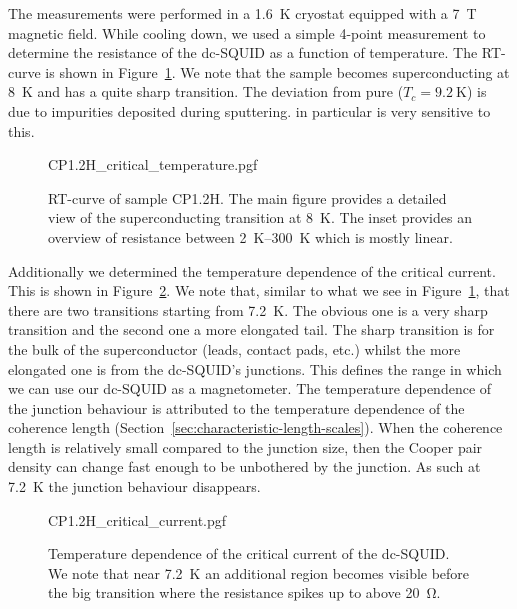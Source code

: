 The measurements were performed in a \qty{1.6}{\kelvin} cryostat equipped with a \qty{7}{\tesla} magnetic field. While cooling down, we used a simple 4-point measurement to determine the resistance of the dc-SQUID as a function of temperature. The RT-curve is shown in Figure~\ref{fig:CP1.2H-SQUID-RT}. We note that the sample becomes superconducting at \qty{8}{\kelvin} and has a quite sharp transition. The deviation from pure  ($T_c=\qty{9.2}{\kelvin}$\cite{maxfieldSuperconductingPenetrationDepth1965}) is due to impurities deposited during sputtering.  in particular is very sensitive to this.

\begin{figure}[ht!]
	\centering
	{CP1.2H_critical_temperature.pgf}
	\caption{
		RT-curve of sample CP1.2H. The main figure provides a detailed view of the superconducting transition at \qty{8}{\kelvin}. The inset provides an overview of resistance between \qtyrange{2}{300}{\kelvin} which is mostly linear.
	}
	\label{fig:CP1.2H-SQUID-RT}
\end{figure}

Additionally we determined the temperature dependence of the critical current. This is shown in Figure~\ref{fig:CP1.2H-SQUID-critical-current-temperature-dependence}. We note that, similar to what we see in Figure~\ref{fig:CP1.2H-SQUID-RT}, that there are two transitions starting from \qty{7.2}{\kelvin}. The obvious one is a very sharp transition and the second one a more elongated tail. The sharp transition is for the bulk of the superconductor (leads, contact pads, etc.) whilst the more elongated one is from the dc-SQUID's junctions. This defines the range in which we can use our dc-SQUID as a magnetometer. The temperature dependence of the junction behaviour is attributed to the temperature dependence of the coherence length (Section~\ref{sec:characteristic-length-scales}). When the coherence length is relatively small compared to the junction size, then the Cooper pair density can change fast enough to be unbothered by the junction. As such at \qty{7.2}{\kelvin} the junction behaviour disappears. 

\begin{figure}[ht!]
	\centering
	{CP1.2H_critical_current.pgf}
	\caption{Temperature dependence of the critical current of the dc-SQUID. We note that near \qty{7.2}{\kelvin} an additional region becomes visible before the big transition where the resistance spikes up to above \qty{20}{\ohm}.}
	\label{fig:CP1.2H-SQUID-critical-current-temperature-dependence}
\end{figure}

